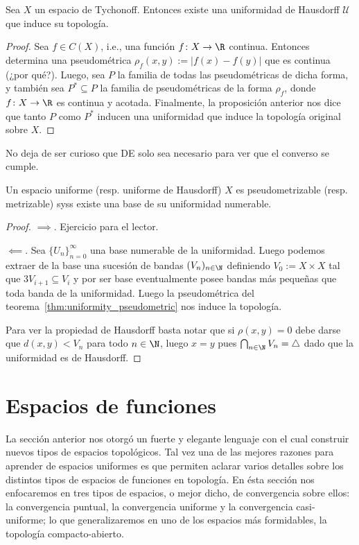 \documentclass[topologia-analisis.tex]{subfiles}
\begin{document}
\begin{thmi}
	Sea $X$ un espacio de Tychonoff. Entonces existe una uniformidad de Hausdorff $\mathcal{U}$ que induce su topología.
\end{thmi}
\begin{proof}
	Sea $f \in C(X)$, i.e., una función $f\colon X \to \R$ continua.
	Entonces determina una pseudométrica $\rho_f(x, y) := |f(x) - f(y)|$ que es continua (¿por qué?).
	Luego, sea $P$ la familia de todas las pseudométricas de dicha forma, y también sea $P^* \subseteq P$ la familia de pseudométricas de la forma $\rho_f$,
	donde $f\colon X \to \R$ es continua y acotada.
	Finalmente, la proposición anterior nos dice que tanto $P$ como $P^*$ inducen una uniformidad que induce la topología original sobre $X$.
\end{proof}
No deja de ser curioso que DE solo sea necesario para ver que el converso se cumple.

\begin{thmi}
	Un espacio uniforme (resp. uniforme de Hausdorff) $X$ es pseudometrizable (resp. metrizable) syss existe una base de su uniformidad numerable.
\end{thmi}
\begin{proof}
	$\implies$. Ejercicio para el lector.

	$\impliedby$. Sea $\{U_n\}_{n=0}^\infty$ una base numerable de la uniformidad. Luego podemos extraer de la base una sucesión de bandas $(V_n)_{n\in\N}$
	definiendo $V_0 := X\times X$ tal que $3V_{i+1} \subseteq V_i$ y por ser base eventualmente posee bandas más pequeñas que toda banda de la uniformidad.
	Luego la pseudométrica del teorema~\ref{thm:uniformity_pseudometric} nos induce la topología.

	Para ver la propiedad de Hausdorff basta notar que si $\rho(x, y) = 0$ debe darse que $d(x, y) < V_n$ para todo $n\in\N$,
	luego $x = y$ pues $\bigcap_{n\in\N} V_n = \triangle$ dado que la uniformidad es de Hausdorff.
\end{proof}

\section{Espacios de funciones}
\label{sec:function_spaces}
La sección anterior nos otorgó un fuerte y elegante lenguaje con el cual construir nuevos tipos de espacios topológicos. Tal vez una de las mejores razones
para aprender de espacios uniformes es que permiten aclarar varios detalles sobre los distintos tipos de espacios de funciones en topología.
En ésta sección nos enfocaremos en tres tipos de espacios, o mejor dicho, de convergencia sobre ellos: la convergencia puntual, la convergencia uniforme
y la convergencia casi-uniforme; lo que generalizaremos en uno de los espacios más formidables, la topología compacto-abierto.
\end{document}
